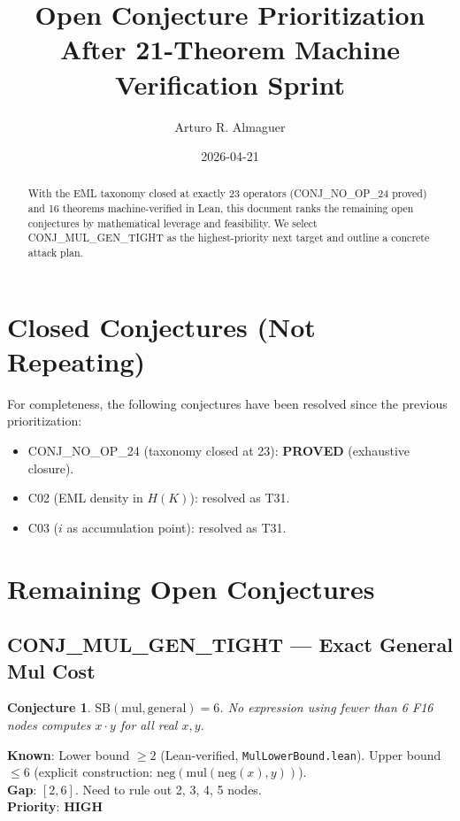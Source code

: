 \documentclass[11pt]{article}
\title{Open Conjecture Prioritization\\After 21-Theorem Machine Verification Sprint}
\author{Arturo R. Almaguer}
\date{2026-04-21}
\newtheorem{conjecture}{Conjecture}
\newcommand{\hp}{\textcolor{high}{\textbf{HIGH}}}
\begin{document}
\maketitle

\begin{abstract}
With the EML taxonomy closed at exactly 23 operators (CONJ\_NO\_OP\_24 proved) and
16 theorems machine-verified in Lean, this document ranks the remaining open conjectures
by mathematical leverage and feasibility. We select CONJ\_MUL\_GEN\_TIGHT as the
highest-priority next target and outline a concrete attack plan.
\end{abstract}

\section{Closed Conjectures (Not Repeating)}

For completeness, the following conjectures have been resolved since the previous
prioritization:
\begin{itemize}
\item CONJ\_NO\_OP\_24 (taxonomy closed at 23): \textbf{PROVED} (exhaustive closure).
\item C02 (EML density in $H(K)$): resolved as T31.
\item C03 ($i$ as accumulation point): resolved as T31.
\end{itemize}

\section{Remaining Open Conjectures}

\subsection{CONJ\_MUL\_GEN\_TIGHT — Exact General Mul Cost}

\begin{conjecture}
$\mathrm{SB}(\mathrm{mul}, \text{general}) = 6$.
No expression using fewer than 6 F16 nodes computes $x \cdot y$ for all
real $x, y$.
\end{conjecture}

\noindent\textbf{Known}: Lower bound $\geq 2$ (Lean-verified, \texttt{MulLowerBound.lean}).
Upper bound $\leq 6$ (explicit construction: $\text{neg}(\text{mul}(\text{neg}(x), y))$).\\
\textbf{Gap}: $[2, 6]$. Need to rule out 2, 3, 4, 5 nodes.\\
\textbf{Priority}: \hp
\end{document}
